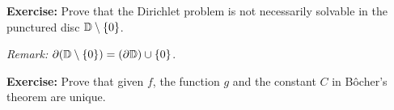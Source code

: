 \documentclass[10pt,aspectratio=169]{beamer}
\begin{document}
\begin{frame}

\textbf{Exercise:}
Prove that the Dirichlet problem is not necessarily solvable in the punctured disc ${\mathbb{D}}
\setminus \{ 0 \}$.

\medskip

\textit{Remark:} $\partial ({\mathbb{D}} \setminus \{ 0 \}) = (\partial {\mathbb{D}} ) \cup \{ 0 \}$.

\medskip
\pause

\textbf{Exercise:}
Prove that given $f$, the function $g$ and the constant $C$ in 
B\^{o}cher's theorem are unique.

\end{frame}
\end{document}
